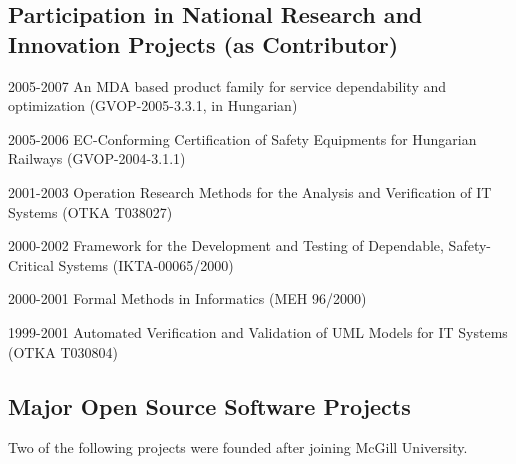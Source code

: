 
\subsection{Participation in National Research and Innovation Projects (as  Contributor)}
\begin{yearlist}
\item[2005-2007] An MDA based product family for service dependability and optimization (GVOP-2005-3.3.1, in Hungarian)  
\item[2005-2006] EC-Conforming Certification of Safety Equipments for Hungarian Railways (GVOP-2004-3.1.1) 
\item[2001-2003] Operation Research Methods for the Analysis and Verification of IT Systems (OTKA T038027) 
\item[2000-2002] Framework for the Development and Testing of Dependable, Safety-Critical Systems (IKTA-00065/2000) 
\item[2000-2001] Formal Methods in Informatics (MEH 96/2000) 
\item[1999-2001] Automated Verification and Validation of UML Models for IT Systems (OTKA T030804) 
\end{yearlist}



\subsection{Major Open Source Software Projects}
Two of the following projects were founded after joining McGill University.

